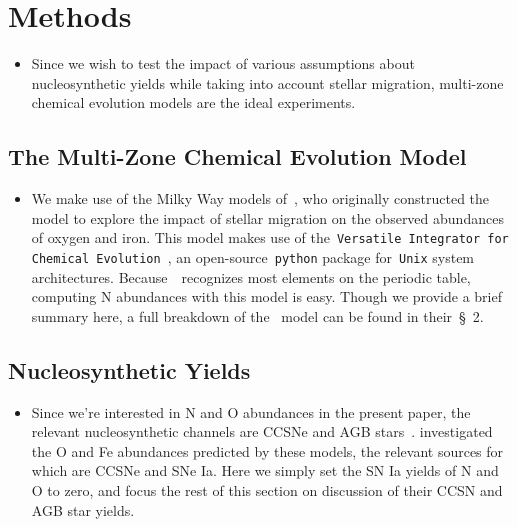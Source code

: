 \documentclass[ms.tex]{subfiles}
\begin{document}
 

\section{Methods} 
\label{sec:methods} 

\begin{itemize} 
	\item Since we wish to test the impact of various assumptions about 
	nucleosynthetic yields while taking into account stellar migration, 
	multi-zone chemical evolution models are the ideal experiments. 
\end{itemize} 

\subsection{The Multi-Zone Chemical Evolution Model} 
\label{sec:methods:multizone} 

\begin{itemize} 
	\item We make use of the Milky Way models of~\citet{Johnson2021}, who 
	originally constructed the model to explore the impact of stellar migration 
	on the observed abundances of oxygen and iron. 
	This model makes use of the~\texttt{Versatile Integrator for Chemical 
	Evolution}~\citep[\vice;][]{Johnson2020, Griffith2021, Johnson2021}, an 
	open-source~\texttt{python} package for~\texttt{Unix} system architectures. 
	Because~\vice~recognizes most elements on the periodic table, computing 
	N abundances with this model is easy. 
	Though we provide a brief summary here, a full breakdown of 
	the~\citet{Johnson2021} model can be found in their~\S~2. 
\end{itemize} 

\subsection{Nucleosynthetic Yields} 
\label{sec:methods:yields} 

\begin{itemize} 
	\item Since we're interested in N and O abundances in the present paper, 
	the relevant nucleosynthetic channels are CCSNe and AGB 
	stars~\citep{Johnson2019}. 
	\citet{Johnson2021} investigated the O and Fe 
	abundances predicted by these models, the relevant sources for which are 
	CCSNe and SNe Ia. 
	Here we simply set the SN Ia yields of N and O to zero, and focus the rest 
	of this section on discussion of their CCSN and AGB star yields. 
\end{itemize} 
\end{document}

